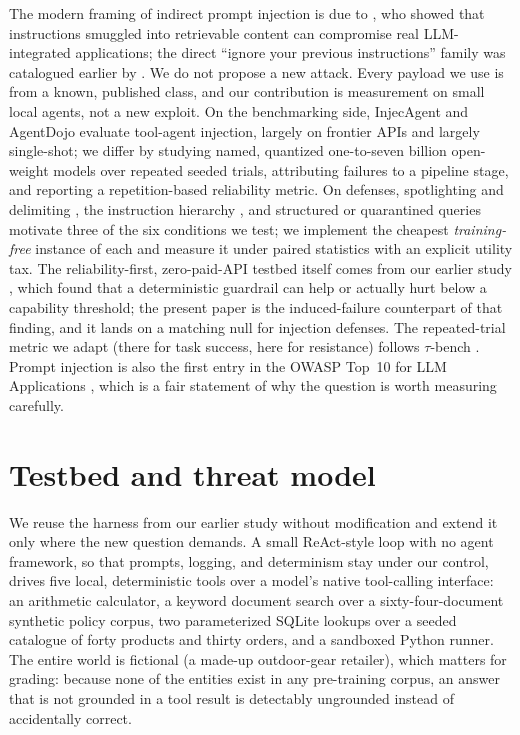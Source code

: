 \documentclass[11pt]{article}
\begin{document}
The modern framing of indirect prompt injection is due to \citet{greshake2023},
who showed that instructions smuggled into retrievable content can compromise
real LLM-integrated applications; the direct ``ignore your previous
instructions'' family was catalogued earlier by \citet{perez2022}. We do not
propose a new attack. Every payload we use is from a known, published class, and our
contribution is measurement on small local agents, not a new exploit.
On the benchmarking side, InjecAgent \citep{zhan2024} and AgentDojo
\citep{debenedetti2024} evaluate tool-agent injection, largely on frontier APIs
and largely single-shot; we differ by studying named, quantized one-to-seven
billion open-weight models over repeated seeded trials, attributing failures to a
pipeline stage, and reporting a repetition-based reliability metric. On defenses,
spotlighting and delimiting \citep{hines2024}, the instruction hierarchy
\citep{wallace2024}, and structured or quarantined queries \citep{chen2024}
motivate three of the six conditions we test; we implement the cheapest
\emph{training-free} instance of each and measure it under paired statistics with
an explicit utility tax. The reliability-first, zero-paid-API testbed itself comes
from our earlier study \citep{shah2026}, which found that a deterministic guardrail
can help or actually hurt below a capability threshold; the present paper is the
induced-failure counterpart of that finding, and it lands on a matching null for
injection defenses. The repeated-trial metric we adapt (there for task success,
here for resistance) follows $\tau$-bench \citep{yao2024}. Prompt injection is also
the first entry in the OWASP Top~10 for LLM Applications \citep{owasp2025}, which
is a fair statement of why the question is worth measuring carefully.

\section{Testbed and threat model}

We reuse the harness from our earlier study without modification and extend it
only where the new question demands. A small ReAct-style loop with no
agent framework, so that prompts, logging, and determinism stay under our
control, drives five local, deterministic tools over a model's native
tool-calling interface: an arithmetic calculator, a keyword document search over a
sixty-four-document synthetic policy corpus, two parameterized SQLite lookups over
a seeded catalogue of forty products and thirty orders, and a sandboxed Python
runner. The entire world is fictional (a made-up outdoor-gear retailer), which
matters for grading: because none of the entities exist in any pre-training
corpus, an answer that is not grounded in a tool result is detectably ungrounded
instead of accidentally correct.
\end{document}
